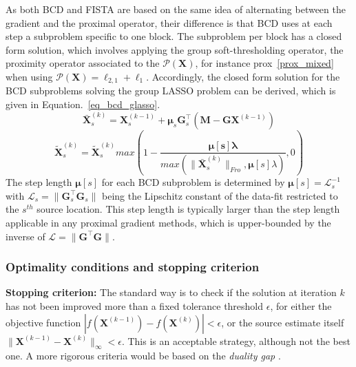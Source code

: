 As both BCD and FISTA are based on the same idea of alternating between the gradient and the proximal operator, their difference is that BCD uses at each step a subproblem specific to one block. The subproblem per block has a closed form solution, which involves applying the group soft-thresholding operator, the proximity operator associated to the $\mathcal{P}(\mathbf{X})$, for instance prox~\ref{prox_mixed} when using $\mathcal{P}(\mathbf{X}) = \ell_{2,1}+\ell_1$. Accordingly, the closed form solution for the BCD subproblems solving the group LASSO problem can be derived, which is given in Equation.~\eqref{eq_bcd_glasso}.
\begin{equation*} \label{eq_bcd_glasso}
\bar{\mathbf{X}}_s^{(k)} = \mathbf{X}_s^{(k-1)}+\mathbf{\mu}_s\mathbf{G}^\top_s(\mathbf{M} - \mathbf{GX}^{(k-1)})
\end{equation*}
\begin{equation}
\tilde{\mathbf{X}}_s^{(k)} = \tilde{\mathbf{X}}_s^{(k)}max(1-\frac{\mathbf{\mu[s]\lambda}}{max(\|\bar{\mathbf{X}}_s^{(k)}\|_{Fro}, \mathbf{\mu}[s]\lambda)}, 0)
\end{equation}
The step length $\mathbf{\mu}[s]$ for each BCD subproblem is determined by $\mathbf{\mu}[s]=\mathcal{L}_s^{-1}$ with $\mathcal{L}_s=\|\mathbf{G}_s^\top\mathbf{G}_s\|$ being the Lipschitz constant of the data-fit restricted to the $s^{th}$ source location. This step length is typically larger than the step length applicable in any proximal gradient methods, which is upper-bounded by the inverse of $\mathcal{L} = \|\mathbf{G}^\top\mathbf{G}\|$.

\subsubsection*{Optimality conditions and stopping criterion}

\textbf{Stopping criterion:} The standard way is to check if the solution at iteration $k$ has not been improved more than a fixed tolerance threshold $\epsilon$, for either the objective function $|f(\mathbf{X}^{(k-1)})-f(\mathbf{X}^{(k)})|<\epsilon$, or the source estimate itself $\|\mathbf{X}^{(k-1)}-\mathbf{X}^{(k)}\|_{\infty}<\epsilon$. This is an acceptable strategy, although not the best one. A more rigorous criteria would be based on the \textit{duality gap} \cite{boyd2004convex,bach2012optimization}.\\

